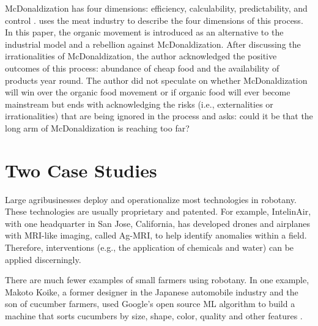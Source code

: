 McDonaldization has four dimensions: efficiency, calculability, predictability, and control \cite{ritzer2002introduction}.  uses the meat industry to describe the four dimensions of this process. In this paper, the organic movement is introduced as an alternative to the industrial model and a rebellion against McDonaldization. After discussing the irrationalities of McDonaldization, the author acknowledged the positive outcomes of this process: abundance of cheap food and the availability of products year round. The author did not speculate on whether McDonaldization will win over the organic food movement or if organic food will ever become mainstream but ends with acknowledging the risks (i.e., externalities or irrationalities) that are being ignored in the process and asks: could it be that the long arm of McDonaldization is reaching too far? \cite{ritzer2009mcdonaldization}

\section{Two Case Studies} 
Large agribusinesses deploy and operationalize most technologies in robotany. These technologies are usually proprietary and patented. For example, IntelinAir, with one headquarter in San Jose, California, has developed drones and airplanes with MRI-like imaging, called Ag-MRI, to help identify anomalies within a field. Therefore, interventions (e.g., the application of chemicals and water) can be applied discerningly. 

There are much fewer examples of small farmers using robotany. In one example, Makoto Koike, a former designer in the Japanese automobile industry and the son of cucumber farmers, used Google's open source ML algorithm to build a machine that sorts cucumbers by size, shape, color, quality and other features \cite{sato2017tensor}.

